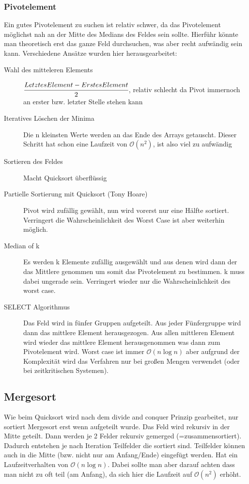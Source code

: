 \documentclass[a4paper]{scrartcl}
\begin{document}
            \subsubsection{Pivotelement}
            Ein gutes Pivotelement zu suchen ist relativ schwer, da  das Pivotelement möglichst nah an der Mitte des Medians des Feldes sein sollte. Hierführ könnte
            man theoretisch erst das ganze Feld durchsuchen, was aber recht aufwändig sein kann. Verschiedene Ansätze wurden hier herausgearbeitet:
            \begin{description}
                \item[Wahl des mitteleren Elements] \(\cfrac{Letztes Element - Erstes Element}{2}\), relativ schlecht da Pivot immernoch an erster bzw. letzter Stelle stehen kann
                \item[Iteratives Löschen der Minima] Die n kleinsten Werte werden an das Ende des Arrays getauscht. Dieser Schritt hat schon eine Laufzeit von \(\mathcal{O}(n^2)\), ist also viel zu aufwändig
                \item[Sortieren des Feldes] Macht Quicksort überflüssig
                \item[Partielle Sortierung mit Quicksort (Tony Hoare)] Pivot wird zufällig gewählt, nun wird vorerst nur eine Hälfte sortiert. Verringert die Wahrscheinlichkeit des Worst Case ist aber weiterhin möglich.
                \item[Median of k] Es werden k Elemente zufällig ausgewählt und aus denen wird dann der das Mittlere genommen um somit das Pivotelement zu bestimmen.
                k muss dabei ungerade sein. Verringert wieder nur die Wahrscheinlichkeit des worst case.
                \item[SELECT Algorithmus] Das Feld wird in fünfer Gruppen aufgeteilt. Aus jeder Fünfergruppe wird dann das mittlere Element herausgezogen. Aus allen 
                mittleren Element wird wieder das mittlere Element herausgenommen was dann zum Pivotelement wird. Worst case ist immer \(\mathcal{O}(n \log n)\) aber
                aufgrund der Komplexität wird das Verfahren nur bei großen Mengen verwendet (oder bei zeitkritischen Systemen).
            \end{description} 

        \subsection{Mergesort}
            Wie beim Quicksort wird nach dem divide and conquer Prinzip gearbeitet, nur sortiert Mergesort erst wenn aufgeteilt wurde. Das Feld wird rekursiv in der Mitte geteilt. Dann werden je 2 Felder rekursiv gemerged (=zusammensortiert). Dadurch entstehen je nach Iteration Teilfelder die sortiert sind. Teilfelder können auch 
            in die Mitte (bzw. nicht nur am Anfang/Ende) eingefügt werden. Hat ein Laufzeitverhalten von \(\mathcal{O}(n \log n)\). Dabei sollte man 
            aber darauf achten dass man nicht zu oft teil (am Anfang), da sich hier die Laufzeit auf \(\mathcal{O}(n^2)\) erhöht.
\end{document}
